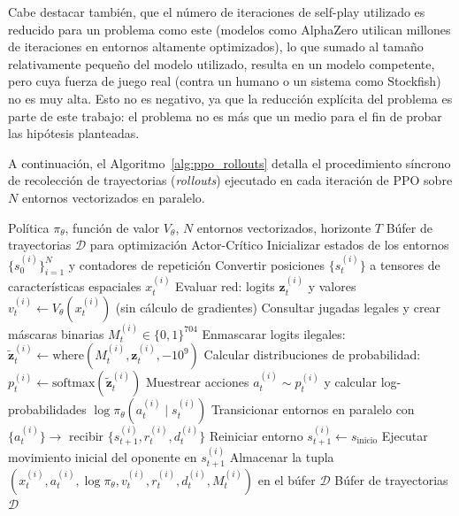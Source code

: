 \documentclass[12pt, a4paper]{article}
\begin{document}
Cabe destacar también, que el número de iteraciones de self-play utilizado es reducido para un problema como este (modelos como AlphaZero utilican millones de iteraciones en entornos altamente optimizados), lo que sumado al tamaño relativamente pequeño del modelo utilizado, resulta en un modelo competente, pero cuya fuerza de juego real (contra un humano o un sistema como Stockfish) no es muy alta. Esto no es negativo, ya que la reducción explícita del problema es parte de este trabajo: el problema no es más que un medio para el fin de probar las hipótesis planteadas.

A continuación, el Algoritmo~\ref{alg:ppo_rollouts} detalla el procedimiento síncrono de recolección de trayectorias (\textit{rollouts}) ejecutado en cada iteración de PPO sobre $N$ entornos vectorizados en paralelo.

\begin{algorithm}[H]
\caption{Recolección de Trayectorias (\textit{Rollouts}) en PPO Paralelo}\label{alg:ppo_rollouts}
\begin{algorithmic}[1]
\Require Política $\pi_\theta$, función de valor $V_\theta$, $N$ entornos vectorizados, horizonte $T$
\Ensure Búfer de trayectorias $\mathcal{D}$ para optimización Actor-Crítico
\State Inicializar estados de los entornos $\{s_0^{(i)}\}_{i=1}^N$ y contadores de repetición
    \State Convertir posiciones $\{s_t^{(i)}\}$ a tensores de características espaciales $x_t^{(i)}$
    \State Evaluar red: logits $\mathbf{z}_t^{(i)}$ y valores $v_t^{(i)} \leftarrow V_\theta(x_t^{(i)})$ (sin cálculo de gradientes)
    \State Consultar jugadas legales y crear máscaras binarias $M_t^{(i)} \in \{0, 1\}^{704}$
    \State Enmascarar logits ilegales: $\tilde{\mathbf{z}}_t^{(i)} \leftarrow \text{where}(M_t^{(i)}, \mathbf{z}_t^{(i)}, -10^9)$
    \State Calcular distribuciones de probabilidad: $p_t^{(i)} \leftarrow \text{softmax}(\tilde{\mathbf{z}}_t^{(i)})$
    \State Muestrear acciones $a_t^{(i)} \sim p_t^{(i)}$ y calcular log-probabilidades $\log \pi_\theta(a_t^{(i)} \mid s_t^{(i)})$
    \State Transicionar entornos en paralelo con $\{a_t^{(i)}\} \rightarrow$ recibir $\{s_{t+1}^{(i)}, r_t^{(i)}, d_t^{(i)}\}$
            \State Reiniciar entorno $s_{t+1}^{(i)} \leftarrow s_{\text{inicio}}$
                \State Ejecutar movimiento inicial del oponente en $s_{t+1}^{(i)}$
            \EndIf
        \EndIf
    \EndFor
    \State Almacenar la tupla $(x_t^{(i)}, a_t^{(i)}, \log \pi_\theta, v_t^{(i)}, r_t^{(i)}, d_t^{(i)}, M_t^{(i)})$ en el búfer $\mathcal{D}$
\EndFor
\State \Return Búfer de trayectorias $\mathcal{D}$
\end{algorithmic}
\end{algorithm}
\end{document}
